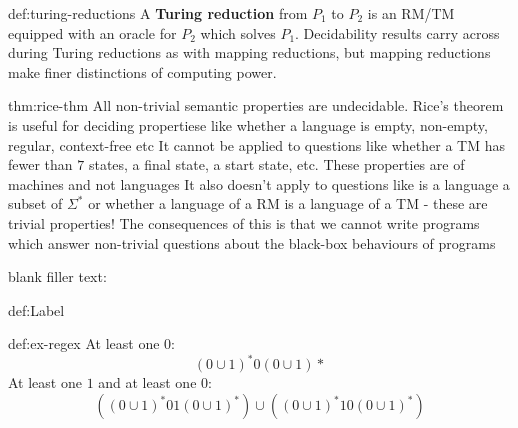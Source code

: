 \documentclass[landscape, 8pt]{extarticle}
\begin{document}
\begin{multicols}{3}
\begin{dfn}{def:turing-reductions}{}
A \textbf{Turing reduction} from $P_{1}$ to $P_{2}$ is an RM/TM equipped with an oracle for $P_{2}$ which solves $P_{1}$.\newline
Decidability results carry across during Turing reductions as with mapping reductions, but mapping reductions make finer distinctions of computing power.
\end{dfn}

\begin{thm}{thm:rice-thm}{}
All non-trivial semantic properties are undecidable.\newline
Rice's theorem is useful for deciding propertiese like whether a language is empty, non-empty, regular, context-free etc\newline
It cannot be applied to questions like whether a TM has fewer than $7$ states, a final state, a start state, etc. These properties are of machines and not languages\newline
It also doesn't apply to questions like is a language a subset of $\Sigma^{*}$ or whether a language of a RM is a language of a TM - these are trivial properties!
The consequences of this is that we cannot write programs which answer non-trivial questions about the black-box behaviours of programs
\end{thm}

blank filler text: \lipsum[1-12]



\begin{dfn}[Name]{def:Label}{}

\end{dfn}


\newpage
\begin{xmp}{def:ex-regex}{}
At least one $0$:
\[(0\cup 1) ^{*} 0(0\cup 1)*\]
At least one $1$ and at least one $0$:
\[((0 \cup 1)^*01(0 \cup 1)^*) \cup ((0 \cup 1)^*10(0 \cup 1)^*)\]
\end{xmp}

\end{multicols}
\end{document}
